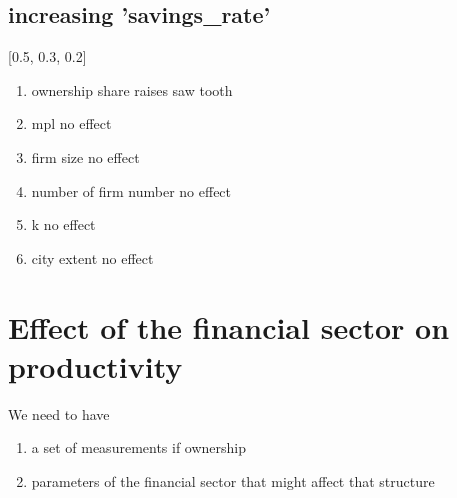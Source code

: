 \subsection{increasing 'savings\_rate'} [0.5, 0.3, 0.2]
   \begin{enumerate}
         \item ownership share  raises saw tooth
        \item mpl                   no effect
        \item firm size             no effect         
        \item number of firm number no effect 
        \item k                     no effect           
        \item city extent           no effect  
     \end{enumerate}

  
    


\section{Effect of the financial sector on productivity}
We need to have  
\begin{enumerate}
    \item a set of measurements if ownership
    \item parameters of the financial sector  that might affect that structure
\end{enumerate}

  
